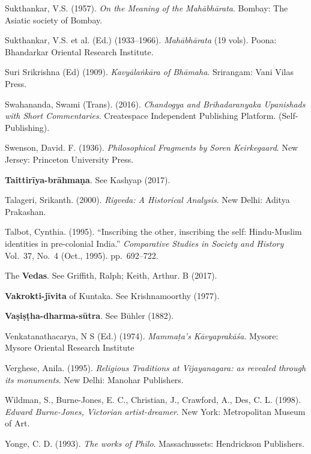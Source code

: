 \begin{thebibliography}{99}
Sukthankar, V.S. (1957). {\sl On the Meaning of the Mahābhārata}. Bombay: The Asiatic society of Bombay. 

Sukthankar, V.S. et al. (Ed.) (1933--1966). {\sl Mahābhārata} (19 vols). Poona: Bhandarkar Oriental Research Institute. 

Suri Srikrishna (Ed) (1909). {\sl Kavyālaṅkāra of Bhāmaha}. Srirangam: Vani Vilas Press. 

Swahananda, Swami (Trans). (2016). {\sl Chandogya and Brihadaranyaka Upanishads with Short Commentaries}. Createspace Independent Publishing Platform. (Self-Publishing). 

Swenson, David. F. (1936). {\sl Philosophical Fragments by Soren Keirkegaard}. New Jersey: Princeton University Press. 

{\bf Taittirīya-brāhmaṇa}. See Kashyap (2017).

Talageri, Srikanth. (2000). {\sl Rigveda: A Historical Analysis}. New Delhi: Aditya Prakashan. 

Talbot, Cynthia. (1995). “Inscribing the other, inscribing the self: Hindu-Muslim identities in pre-colonial India.” {\sl Comparative Studies in Society and History} Vol.~37, No.~4 (Oct., 1995). pp.~692--722.

The {\bf Vedas}. See Griffith, Ralph; Keith, Arthur. B (2017).

{\bf Vakrokti-jīvita} of Kuntaka. See Krishnamoorthy (1977).

{\bf Vaṣiṣṭha-dharma-sūtra}. See Bühler (1882).

Venkatanathacarya, N S (Ed.) (1974). {\sl Mammaṭa’s Kāvyaprakāśa}. Mysore: Mysore Oriental Research Institute

Verghese, Anila. (1995). {\sl Religious Traditions at Vijayanagara: as revealed through its monuments}. New  Delhi: Manohar Publishers. 

Wildman, S., Burne-Jones, E. C., Christian, J., Crawford, A., Des, C. L. (1998). {\sl Edward Burne-Jones, Victorian artist-dreamer}. New York: Metropolitan Museum of Art. 

Yonge, C. D. (1993). {\sl The works of Philo}. Massachussets: Hendrickson Publishers.
\end{thebibliography}
